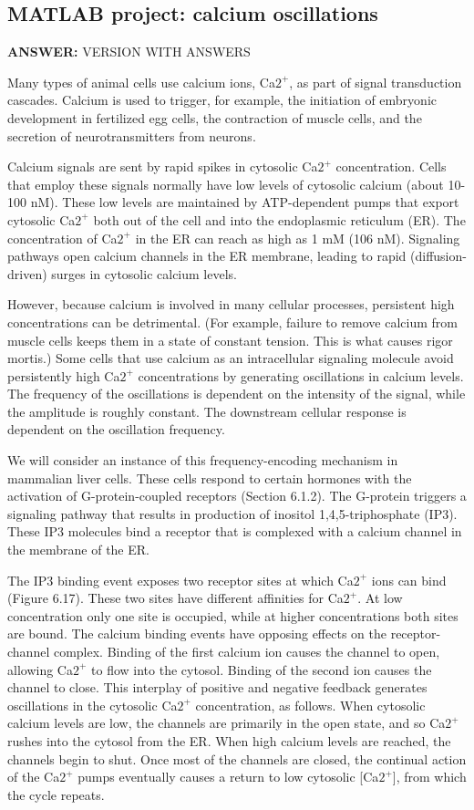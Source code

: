 \documentclass[12pt]{article}
\newcommand{\ans}[1]{

{\bf ANSWER:} #1\medskip}
\begin{document}
\subsection*{MATLAB project: calcium oscillations}

\ans{VERSION WITH ANSWERS}

Many types of animal cells use calcium ions, Ca$2^+$, as part of signal
transduction cascades. Calcium is used to trigger, for example, the initiation
of embryonic development in fertilized egg cells, the contraction of muscle
cells, and the secretion of neurotransmitters from neurons.

Calcium signals are sent by rapid spikes in cytosolic Ca$2^+$ concentration.
Cells that employ these signals normally have low levels of cytosolic calcium
(about 10-100 nM). These low levels are maintained by ATP-dependent pumps that
export cytosolic Ca$2^+$ both out of the cell and into the endoplasmic
reticulum (ER). The concentration of Ca$2^+$ in the ER can reach as high as 1
mM (106 nM). Signaling pathways open calcium channels in the ER membrane,
leading to rapid (diffusion-driven) surges in cytosolic calcium levels.

However, because calcium is involved in many cellular processes, persistent
high concentrations can be detrimental. (For example, failure to remove
calcium from muscle cells keeps them in a state of constant tension.  This is
what causes rigor mortis.) Some cells that use calcium as an intracellular
signaling molecule avoid persistently high Ca$2^+$ concentrations by generating
oscillations in calcium levels. The frequency of the oscillations is dependent
on the intensity of the signal, while the amplitude is roughly constant. The
downstream cellular response is dependent on the oscillation frequency.

We will consider an instance of this frequency-encoding mechanism in mammalian
liver cells.  These cells respond to certain hormones with the activation of
G-protein-coupled receptors (Section 6.1.2). The G-protein triggers a
signaling pathway that results in production of inositol 1,4,5-triphosphate
(IP3). These IP3 molecules bind a receptor that is complexed with a calcium
channel in the membrane of the ER.

The IP3 binding event exposes two receptor sites at which Ca$2^+$ ions can bind
(Figure 6.17).  These two sites have different affinities for Ca$2^+$.  At low
concentration only one site is occupied, while at higher concentrations both
sites are bound. The calcium binding events have opposing effects on the
receptor-channel complex.  Binding of the first calcium ion causes the channel
to open, allowing Ca$2^+$ to flow into the cytosol.  Binding of the second ion
causes the channel to close. This interplay of positive and negative feedback
generates oscillations in the cytosolic Ca$2^+$ concentration, as follows. When
cytosolic calcium levels are low, the channels are primarily in the open
state, and so Ca$2^+$ rushes into the cytosol from the ER. When high calcium
levels are reached, the channels begin to shut. Once most of the channels are
closed, the continual action of the Ca$2^+$ pumps eventually causes a return to
low cytosolic [Ca$2^+$], from which the cycle repeats.
\end{document}
